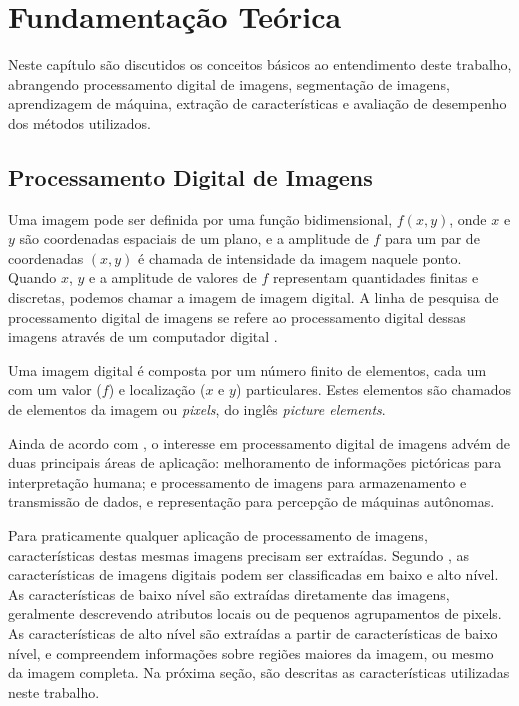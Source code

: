 \chapter{Fundamentação Teórica}\label{cap:fundamentacao}

Neste capítulo são discutidos os conceitos básicos ao entendimento deste trabalho, abrangendo processamento digital de imagens, segmentação de imagens, aprendizagem de máquina, extração de características e avaliação de desempenho dos métodos utilizados.

\section{Processamento Digital de Imagens}

Uma imagem pode ser definida por uma função bidimensional, $f(x,y)$, onde $x$ e $y$ são coordenadas espaciais de um plano, e a amplitude de $f$ para um par de coordenadas $(x,y)$ é chamada de intensidade da imagem naquele ponto. Quando $x$, $y$ e a amplitude de valores de $f$ representam quantidades finitas e discretas, podemos chamar a imagem de imagem  digital. A linha de pesquisa de processamento digital de imagens se refere ao processamento digital dessas imagens através de um computador digital \cite{gonzalez:2002}.

Uma imagem digital é composta por um número finito de elementos, cada um com um valor ($f$) e localização ($x$ e $y$) particulares. Estes elementos são chamados de elementos da imagem ou \textit{pixels}, do inglês \textit{picture elements}.

Ainda de acordo com , o interesse em processamento digital de imagens advém de duas principais áreas de aplicação: melhoramento de informações pictóricas para interpretação humana; e processamento de imagens para armazenamento e transmissão de dados, e representação para percepção de máquinas autônomas.

Para praticamente qualquer aplicação de processamento de imagens, características destas mesmas imagens precisam ser extraídas. Segundo , as características de imagens digitais podem ser classificadas em baixo e alto nível. As características de baixo nível são extraídas diretamente das imagens, geralmente descrevendo atributos locais ou de pequenos agrupamentos de pixels. As características de alto nível são extraídas a partir de características de baixo nível, e compreendem informações sobre regiões maiores da imagem, ou mesmo da imagem completa. Na próxima seção, são descritas as características utilizadas neste trabalho.

